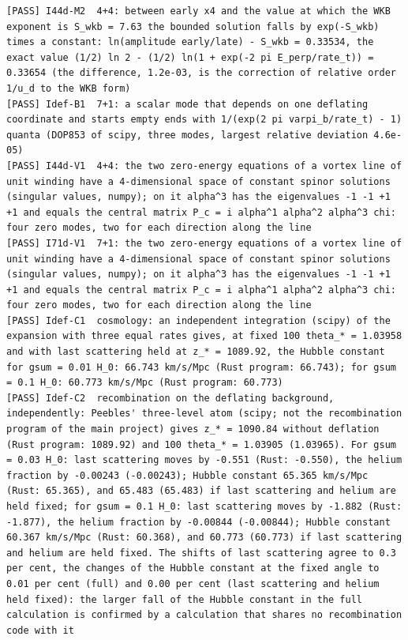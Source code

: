 \documentclass[
  10pt,
]{article}
\begin{document}
\begin{verbatim}
[PASS] I44d-M2  4+4: between early x4 and the value at which the WKB exponent is S_wkb = 7.63 the bounded solution falls by exp(-S_wkb) times a constant: ln(amplitude early/late) - S_wkb = 0.33534, the exact value (1/2) ln 2 - (1/2) ln(1 + exp(-2 pi E_perp/rate_t)) = 0.33654 (the difference, 1.2e-03, is the correction of relative order 1/u_d to the WKB form)
[PASS] Idef-B1  7+1: a scalar mode that depends on one deflating coordinate and starts empty ends with 1/(exp(2 pi varpi_b/rate_t) - 1) quanta (DOP853 of scipy, three modes, largest relative deviation 4.6e-05)
[PASS] I44d-V1  4+4: the two zero-energy equations of a vortex line of unit winding have a 4-dimensional space of constant spinor solutions (singular values, numpy); on it alpha^3 has the eigenvalues -1 -1 +1 +1 and equals the central matrix P_c = i alpha^1 alpha^2 alpha^3 chi: four zero modes, two for each direction along the line
[PASS] I71d-V1  7+1: the two zero-energy equations of a vortex line of unit winding have a 4-dimensional space of constant spinor solutions (singular values, numpy); on it alpha^3 has the eigenvalues -1 -1 +1 +1 and equals the central matrix P_c = i alpha^1 alpha^2 alpha^3 chi: four zero modes, two for each direction along the line
[PASS] Idef-C1  cosmology: an independent integration (scipy) of the expansion with three equal rates gives, at fixed 100 theta_* = 1.03958 and with last scattering held at z_* = 1089.92, the Hubble constant for gsum = 0.01 H_0: 66.743 km/s/Mpc (Rust program: 66.743); for gsum = 0.1 H_0: 60.773 km/s/Mpc (Rust program: 60.773)
[PASS] Idef-C2  recombination on the deflating background, independently: Peebles' three-level atom (scipy; not the recombination program of the main project) gives z_* = 1090.84 without deflation (Rust program: 1089.92) and 100 theta_* = 1.03905 (1.03965). For gsum = 0.03 H_0: last scattering moves by -0.551 (Rust: -0.550), the helium fraction by -0.00243 (-0.00243); Hubble constant 65.365 km/s/Mpc (Rust: 65.365), and 65.483 (65.483) if last scattering and helium are held fixed; for gsum = 0.1 H_0: last scattering moves by -1.882 (Rust: -1.877), the helium fraction by -0.00844 (-0.00844); Hubble constant 60.367 km/s/Mpc (Rust: 60.368), and 60.773 (60.773) if last scattering and helium are held fixed. The shifts of last scattering agree to 0.3 per cent, the changes of the Hubble constant at the fixed angle to 0.01 per cent (full) and 0.00 per cent (last scattering and helium held fixed): the larger fall of the Hubble constant in the full calculation is confirmed by a calculation that shares no recombination code with it

\end{verbatim}
\end{document}
